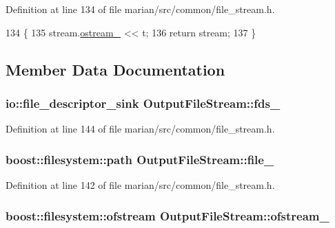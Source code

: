 Definition at line 134 of file marian/src/common/file\+\_\+stream.\+h.


\begin{DoxyCode}
134                                                                             \{
135     stream.\hyperlink{classOutputFileStream_ab2ea25eb576078ee0998e7c53d6034a7}{ostream\_} << t;
136     \textcolor{keywordflow}{return} stream;
137   \}
\end{DoxyCode}


\subsection{Member Data Documentation}
\subsubsection[{\texorpdfstring{fds\+\_\+}{fds_}}]{\setlength{\rightskip}{0pt plus 5cm}io\+::file\+\_\+descriptor\+\_\+sink Output\+File\+Stream\+::fds\+\_\+\hspace{0.3cm}{\ttfamily [private]}}\hypertarget{classOutputFileStream_ae904a4f9b831d34c667118c9dada39de}{}\label{classOutputFileStream_ae904a4f9b831d34c667118c9dada39de}


Definition at line 144 of file marian/src/common/file\+\_\+stream.\+h.

\subsubsection[{\texorpdfstring{file\+\_\+}{file_}}]{\setlength{\rightskip}{0pt plus 5cm}boost\+::filesystem\+::path Output\+File\+Stream\+::file\+\_\+\hspace{0.3cm}{\ttfamily [private]}}\hypertarget{classOutputFileStream_a507392eedcce53121fa100aa45e1dc86}{}\label{classOutputFileStream_a507392eedcce53121fa100aa45e1dc86}


Definition at line 142 of file marian/src/common/file\+\_\+stream.\+h.

\subsubsection[{\texorpdfstring{ofstream\+\_\+}{ofstream_}}]{\setlength{\rightskip}{0pt plus 5cm}boost\+::filesystem\+::ofstream Output\+File\+Stream\+::ofstream\+\_\+\hspace{0.3cm}{\ttfamily [private]}}\hypertarget{classOutputFileStream_a75f268bdd0977b6e16eca85effdae7ed}{}\label{classOutputFileStream_a75f268bdd0977b6e16eca85effdae7ed}


